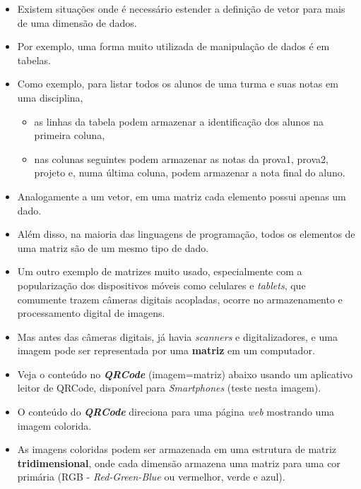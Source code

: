 \documentclass[12pt,a4paper]{article}
\providecommand{\tightlist}{%
      \setlength{\itemsep}{0pt}\setlength{\parskip}{0pt}}
\begin{document}
    \begin{itemize}
\item
  Existem situações onde é necessário estender a definição de vetor para
  mais de uma dimensão de dados.
\item
  Por exemplo, uma forma muito utilizada de manipulação de dados é em
  tabelas.
\item
  Como exemplo, para listar todos os alunos de uma turma e suas notas em
  uma disciplina,

  \begin{itemize}
  \tightlist
  \item
    as linhas da tabela podem armazenar a identificação dos alunos na
    primeira coluna,
  \item
    nas colunas seguintes podem armazenar as notas da prova1, prova2,
    projeto e, numa última coluna, podem armazenar a nota final do
    aluno.
  \end{itemize}
\item
  Analogamente a um vetor, em uma matriz cada elemento possui apenas um
  dado.
\item
  Além disso, na maioria das linguagens de programação, todos os
  elementos de uma matriz são de um mesmo tipo de dado.
\end{itemize}

    \begin{itemize}
\item
  Um outro exemplo de matrizes muito usado, especialmente com a
  popularização dos dispositivos móveis como celulares e \emph{tablets},
  que comumente trazem câmeras digitais acopladas, ocorre no
  armazenamento e processamento digital de imagens.
\item
  Mas antes das câmeras digitais, já havia \emph{scanners} e
  digitalizadores, e uma imagem pode ser representada por uma
  \textbf{matriz} em um computador.
\item
  Veja o conteúdo no \textbf{\emph{QRCode}} (imagem=matriz) abaixo
  usando um aplicativo leitor de QRCode, disponível para
  \emph{Smartphones} (teste nesta imagem).
\item
  O conteúdo do \textbf{\emph{QRCode}} direciona para uma página
  \emph{web} mostrando uma imagem colorida.
\item
  As imagens coloridas podem ser armazenada em uma estrutura de matriz
  \textbf{tridimensional}, onde cada dimensão armazena uma matriz para
  uma cor primária (RGB - \emph{Red-Green-Blue} ou vermelhor, verde e
  azul).
\end{itemize}
\end{document}

